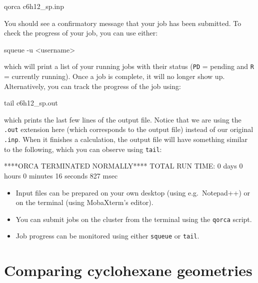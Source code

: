 \documentclass[10pt]{article}
\begin{document}
\begin{cmdline}
qorca c6h12_sp.inp
\end{cmdline}

You should see a confirmatory message that your job has been submitted. To check the progress of your job, you can use either:

\begin{cmdline}
squeue -u <username>
\end{cmdline}

which will print a list of your running jobs with their status (\texttt{PD} = pending and \texttt{R} = currently running). Once a job is complete, it will no longer show up. Alternatively, you can track the progress of the job using:

\begin{cmdline}
tail c6h12_sp.out
\end{cmdline}

which prints the last few lines of the output file. Notice that we are using the \texttt{.out} extension here (which corresponds to the output file) instead of our original \texttt{.inp}. When it finishes a calculation, the output file will have something similar to the following, which you can observe using \texttt{tail}:

\begin{cmdline}
              ****ORCA TERMINATED NORMALLY****
TOTAL RUN TIME: 0 days 0 hours 0 minutes 16 seconds 827 msec
\end{cmdline}

\vspace{-0.2cm}

\begin{summary}
    \begin{itemize}[leftmargin=0.6cm]
        \item Input files can be prepared on your own desktop (using e.g.\ Notepad++) or on the terminal (using MobaXterm's editor).
        \item You can submit jobs on the cluster from the terminal using the \texttt{qorca} script.
        \item Job progress can be monitored using either \texttt{squeue} or \texttt{tail}.
    \end{itemize}
\end{summary}

\section{Comparing cyclohexane geometries}
\end{document}
